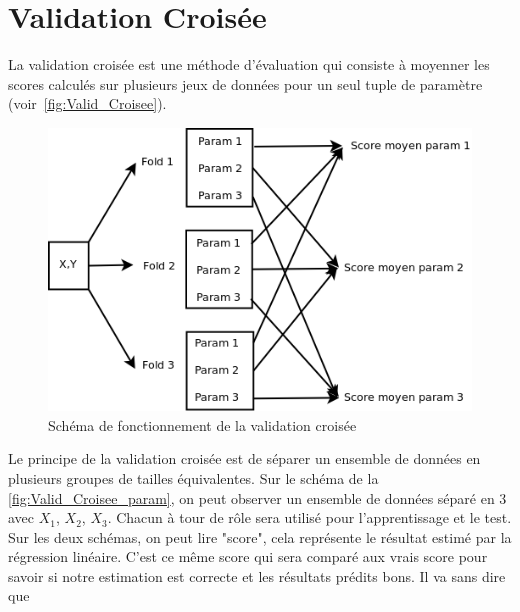 \section{Validation Croisée}

La validation croisée est une méthode d'évaluation qui consiste à moyenner les scores calculés sur plusieurs jeux de données pour un seul tuple de paramètre (voir~\autoref{fig:Valid_Croisee}).


\begin{figure}[htpb]
	\centering
	\includegraphics[scale = 0.25]{images/Valid_Croisee}
	\caption{Schéma de fonctionnement de la validation croisée}
	\label{fig:Valid_Croisee}
\end{figure}


Le principe de la validation croisée est de séparer un ensemble de données en plusieurs groupes de tailles équivalentes.
Sur le schéma de la  \autoref{fig:Valid_Croisee_param}, on peut observer un ensemble de données séparé en 3 avec $X_{1}$, $X_{2}$, $X_{3}$.
Chacun à tour de rôle sera utilisé pour l'apprentissage et le test. 
Sur les deux schémas, on peut lire "score", cela représente le résultat estimé par la régression linéaire. C'est ce même score qui sera comparé aux vrais score pour savoir si notre estimation est correcte et les résultats prédits bons. 
Il va sans dire que 

